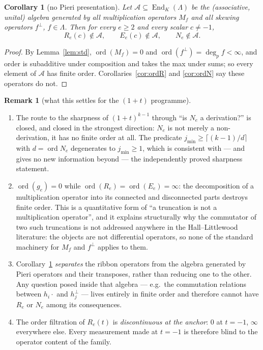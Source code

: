 \documentclass[11pt]{article}
\theoremstyle{plain}
\newtheorem{corollary}[theorem]{Corollary}
\theoremstyle{definition}
\newtheorem{remark}[theorem]{Remark}
\DeclareMathOperator{\ord}{ord}
\newcommand{\LL}{\Lambda}
\begin{document}
\begin{corollary}[no Pieri presentation]\label{cor:pieri}
Let $\mathcal A\subseteq\operatorname{End}_K(\LL)$ be the (associative, unital)
algebra generated by all multiplication operators $M_f$ and all skewing
operators $f^{\perp}$, $f\in\LL$.  Then for every $e\ge2$ and every scalar
$c\neq-1$,
\[
  R_e(c)\notin\mathcal A,\qquad E_e(c)\notin\mathcal A,\qquad N_e\notin\mathcal A .
\]
\end{corollary}

\begin{proof}
By Lemma~\ref{lem:std}, $\ord(M_f)=0$ and $\ord(f^{\perp})=\deg_pf<\infty$, and
order is subadditive under composition and takes the max under sums; so every
element of $\mathcal A$ has finite order.  Corollaries~\ref{cor:ordR} and
\ref{cor:ordN} say these operators do not.
\end{proof}

\begin{remark}[what this settles for the $(1+t)$ programme]
\begin{enumerate}
\item The route to the sharpness of $(1+t)^{k-1}$ through ``is $N_e$ a
derivation?'' is closed, and closed in the strongest direction: $N_e$ is not
merely a non-derivation, it has no finite order at all.  The predicate
$j_{\min}\ge\lceil (k-1)/d\rceil$ with $d=\ord N_e$ degenerates to
$j_{\min}\ge1$, which is consistent with --- and gives no new information
beyond --- the independently proved sharpness statement.
\item $\ord(g_e)=0$ while $\ord(R_e)=\ord(E_e)=\infty$: the decomposition of a
multiplication operator into its connected and disconnected parts destroys
finite order.  This is a quantitative form of ``a truncation is not a
multiplication operator'', and it explains structurally why the commutator of
two such truncations is not addressed anywhere in the Hall--Littlewood
literature: the objects are not differential operators, so none of the standard
machinery for $M_f$ and $f^{\perp}$ applies to them.
\item Corollary~\ref{cor:pieri} \emph{separates} the ribbon operators from the
algebra generated by Pieri operators and their transposes, rather than reducing
one to the other.  Any question posed inside that algebra --- e.g.\ the
commutation relations between $h_i\cdot$ and $h_j^{\perp}$ --- lives entirely in
finite order and therefore cannot have $R_e$ or $N_e$ among its consequences.
\item The order filtration of $R_e(t)$ is \emph{discontinuous at the anchor}:
$0$ at $t=-1$, $\infty$ everywhere else.  Every measurement made at $t=-1$ is
therefore blind to the operator content of the family.
\end{enumerate}
\end{remark}
\end{document}
